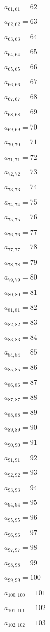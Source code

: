 \documentclass[a4paper,12pt]{article}
\begin{document}
$a _{ 61, 61 } = 62$

$a _{ 62, 62 } = 63$

$a _{ 63, 63 } = 64$

$a _{ 64, 64 } = 65$

$a _{ 65, 65 } = 66$

$a _{ 66, 66 } = 67$

$a _{ 67, 67 } = 68$

$a _{ 68, 68 } = 69$

$a _{ 69, 69 } = 70$

$a _{ 70, 70 } = 71$

$a _{ 71, 71 } = 72$

$a _{ 72, 72 } = 73$

$a _{ 73, 73 } = 74$

$a _{ 74, 74 } = 75$

$a _{ 75, 75 } = 76$

$a _{ 76, 76 } = 77$

$a _{ 77, 77 } = 78$

$a _{ 78, 78 } = 79$

$a _{ 79, 79 } = 80$

$a _{ 80, 80 } = 81$

$a _{ 81, 81 } = 82$

$a _{ 82, 82 } = 83$

$a _{ 83, 83 } = 84$

$a _{ 84, 84 } = 85$

$a _{ 85, 85 } = 86$

$a _{ 86, 86 } = 87$

$a _{ 87, 87 } = 88$

$a _{ 88, 88 } = 89$

$a _{ 89, 89 } = 90$

$a _{ 90, 90 } = 91$

$a _{ 91, 91 } = 92$

$a _{ 92, 92 } = 93$

$a _{ 93, 93 } = 94$

$a _{ 94, 94 } = 95$

$a _{ 95, 95 } = 96$

$a _{ 96, 96 } = 97$

$a _{ 97, 97 } = 98$

$a _{ 98, 98 } = 99$

$a _{ 99, 99 } = 100$

$a _{ 100, 100 } = 101$

$a _{ 101, 101 } = 102$

$a _{ 102, 102 } = 103$
\end{document}
